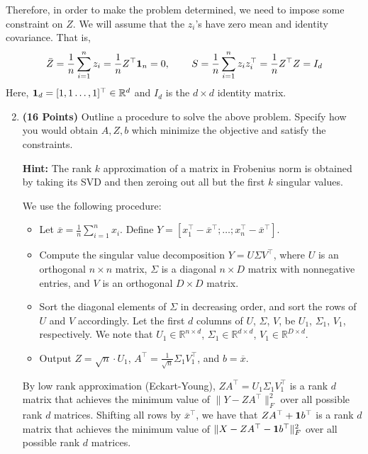 \documentclass[a4paper]{article}
\newcommand*{\one}{{\bf 1}}
\newcommand{\Zbar}{\bar{Z}}
\theoremstyle{definition}
\newcommand{\RR}{\mathbb{R}}
\newenvironment{soln}{
    \leavevmode\color{blue}\ignorespaces
}{}
\begin{document}
Therefore, in order to make the problem determined, we need to impose some
constraint on $Z$. We will assume that the $z_i$'s have zero mean and identity covariance.
That is,
\begin{align*}
\Zbar = \frac{1}{n} \sum_{i=1}^n z_i =\frac{1}{n} Z^\top {\bf 1}_n = 0, \hspace{0.3in}
S = \frac{1}{n} \sum_{i=1}^n z_i z_i^\top
= \frac{1}{n} Z^\top Z
= I_d
\end{align*}
Here, ${\bf 1}_d = [1, 1 \dots, 1]^\top \in\RR^d$ and $I_d$  is the $d\times d$ identity matrix.

\begin{enumerate}
\setcounter{enumi}{1}
\item \textbf{(16 Points)}
Outline a procedure to solve the above problem. Specify how you
would obtain $A, Z, b$ which minimize the objective and satisfy the constraints.

\textbf{Hint: }The rank $k$ approximation of a matrix in Frobenius norm is obtained by
taking its SVD and then zeroing out all but the first $k$ singular values.

        \begin{soln}
          We use the following procedure:
          \begin{itemize}
            \item Let $\overline{x}=\frac{1}{n}\sum_{i=1}^{n} x_{i}$. Define $Y=[x_{1}^{\top}-\overline{x}^{\top};\dots;x_{n}^{\top}-\overline{x}^{\top}]$.

            \item Compute the singular value decomposition $Y=U\Sigma V^{\top}$, where $U$ is an orthogonal $n\times n$ matrix, $\Sigma$ is a diagonal $n\times D$ matrix with nonnegative entries, and $V$ is an orthogonal $D\times D$ matrix.

            \item Sort the diagonal elements of $\Sigma$ in decreasing order, and sort the rows of $U$ and $V$ accordingly. Let the first $d$ columns of $U$, $\Sigma$, $V$, be $U_{1}$, $\Sigma_{1}$, $V_{1}$, respectively. We note that $U_{1}\in \RR^{n\times d}$, $\Sigma_{1}\in \RR^{d\times d}$, $V_{1}\in \RR^{D\times d}$.

            \item Output $Z=\sqrt{n}\cdot U_{1}$, $A^{\top}=\frac{1}{\sqrt{n}}\Sigma_{1}V_{1}^{\top}$, and $b=\overline{x}$.
          \end{itemize}
          By low rank approximation (Eckart-Young), $ZA^{\top}=U_{1}\Sigma_{1}V_{1}^{\top}$ is a rank $d$ matrix that achieves the minimum value of $\|Y-ZA^{\top}\|_{F}^{2}$ over all possible rank $d$ matrices. Shifting all rows by $\overline{x}^{\top}$, we have that $ZA^{\top}+\one b^{\top}$ is a rank $d$ matrix that achieves the minimum value of $\|X-ZA^{\top}-\one b^{\top}\|_{F}^{2}$ over all possible rank $d$ matrices.


\end{soln}
\end{enumerate}
\end{document}
